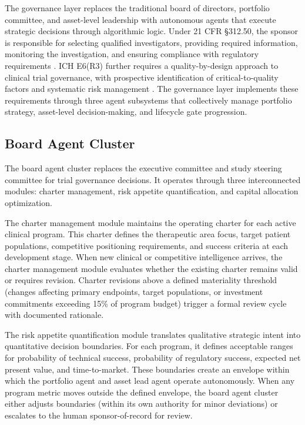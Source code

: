 
The governance layer replaces the traditional board of directors, portfolio committee, and
asset-level leadership with autonomous agents that execute strategic decisions through
algorithmic logic. Under 21 CFR \S312.50, the sponsor is responsible for selecting qualified
investigators, providing required information, monitoring the investigation, and ensuring
compliance with regulatory requirements \cite{cfr-part-312}. ICH E6(R3) further requires a
quality-by-design approach to clinical trial governance, with prospective identification of
critical-to-quality factors and systematic risk management \cite{ich-e6r3}. The governance
layer implements these requirements through three agent subsystems that collectively manage
portfolio strategy, asset-level decision-making, and lifecycle gate progression.

\subsection{Board Agent Cluster}

The board agent cluster replaces the executive committee and study steering committee for
trial governance decisions. It operates through three interconnected modules: charter
management, risk appetite quantification, and capital allocation optimization.

The charter management module maintains the operating charter for each active clinical
program. This charter defines the therapeutic area focus, target patient populations,
competitive positioning requirements, and success criteria at each development stage.
When new clinical or competitive intelligence arrives, the charter management module
evaluates whether the existing charter remains valid or requires revision. Charter revisions
above a defined materiality threshold (changes affecting primary endpoints, target populations,
or investment commitments exceeding 15\% of program budget) trigger a formal review cycle
with documented rationale.

The risk appetite quantification module translates qualitative strategic intent into
quantitative decision boundaries. For each program, it defines acceptable ranges for
probability of technical success, probability of regulatory success, expected net present
value, and time-to-market. These boundaries create an envelope within which the portfolio
agent and asset lead agent operate autonomously. When any program metric moves outside the
defined envelope, the board agent cluster either adjusts boundaries (within its own authority
for minor deviations) or escalates to the human sponsor-of-record for review.

